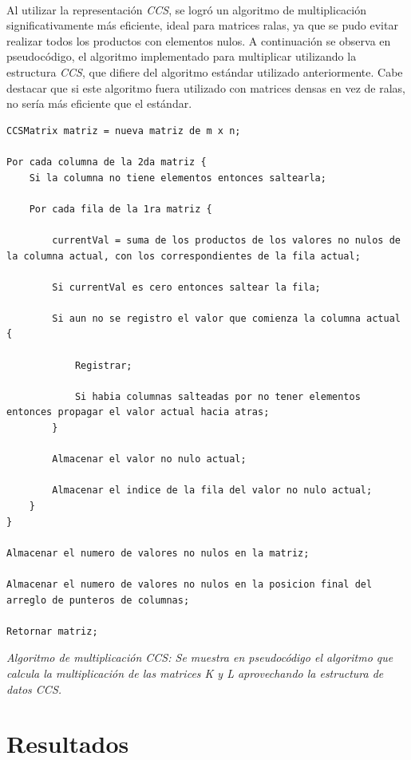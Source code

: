 \documentclass[a4paper,11pt]{article}
\begin{document}
\paragraph{}
Al utilizar la representaci\'on \emph{CCS}, se logr\'o un algoritmo de multiplicaci\'on significativamente m\'as eficiente, ideal para matrices ralas, ya que se pudo evitar realizar todos los productos con elementos nulos. A continuaci\'on se observa en pseudoc\'odigo, el algoritmo implementado para multiplicar utilizando la estructura \emph{CCS}, que difiere del algoritmo est\'andar utilizado anteriormente. Cabe destacar que si este algoritmo fuera utilizado con matrices densas en vez de ralas, no ser\'ia m\'as eficiente que el est\'andar.\\
\newpage
\small\begin{lstlisting}
CCSMatrix matriz = nueva matriz de m x n;

Por cada columna de la 2da matriz {
    Si la columna no tiene elementos entonces saltearla;

 	Por cada fila de la 1ra matriz {
 		
 		currentVal = suma de los productos de los valores no nulos de la columna actual, con los correspondientes de la fila actual;
	
		Si currentVal es cero entonces saltear la fila;

 		Si aun no se registro el valor que comienza la columna actual {

	 		Registrar;	

 			Si habia columnas salteadas por no tener elementos entonces propagar el valor actual hacia atras;
		}
 	
 		Almacenar el valor no nulo actual;
 	
 		Almacenar el indice de la fila del valor no nulo actual;
	}
}

Almacenar el numero de valores no nulos en la matriz;

Almacenar el numero de valores no nulos en la posicion final del arreglo de punteros de columnas;

Retornar matriz;

\end{lstlisting}
\small\emph{Algoritmo de multiplicaci\'on CCS: Se muestra en pseudoc\'odigo el algoritmo que calcula la multiplicaci\'on de las matrices K y L aprovechando la estructura de datos CCS.}

\newpage
\section{Resultados}
\end{document}
